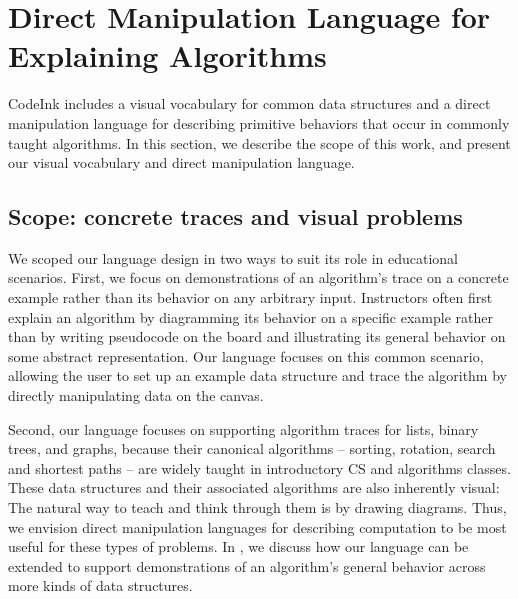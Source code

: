 \section{Direct Manipulation Language for Explaining Algorithms}

CodeInk includes a visual vocabulary for common data structures and a direct
manipulation language for describing primitive behaviors that occur in commonly
taught algorithms. In this section, we describe the scope of this work, and
present our visual vocabulary and direct manipulation language.

\subsection{Scope: concrete traces and visual problems}

We scoped our language design in two ways to suit its role in educational
scenarios. First, we focus on demonstrations of an algorithm's trace on a
concrete example rather than its behavior on any arbitrary input. Instructors often first explain an algorithm by diagramming
its behavior on a specific example rather than by writing pseudocode on the
board and illustrating its general behavior on some abstract representation. Our
language focuses on this common scenario, allowing the user to set up an example
data structure and trace the algorithm by directly manipulating data on the
canvas.

Second, our language focuses on supporting algorithm traces for lists, binary
trees, and graphs, because their canonical algorithms -- sorting, rotation,
search and shortest paths -- are widely taught in introductory CS and algorithms
classes. These data structures and their associated algorithms are also
inherently visual: The natural way to teach and think through them is by drawing
diagrams. Thus, we envision direct manipulation languages for describing
computation to be most useful for these types of problems.
%
%
In , we discuss how our language can be
extended to support demonstrations of an algorithm's general behavior
across more kinds of data structures.

